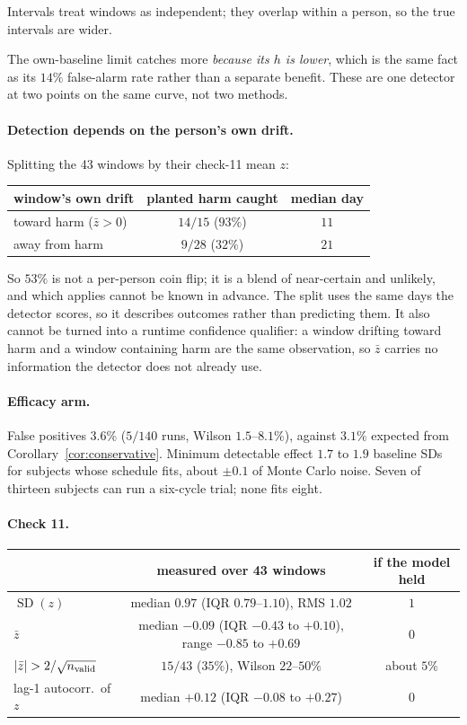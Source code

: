 \documentclass{article}
\theoremstyle{plain}
\theoremstyle{definition}
\theoremstyle{remark}
\numberwithin{equation}{section}
\begin{document}
\noindent Intervals treat windows as independent; they overlap within a
person, so the true intervals are wider.

The own-baseline limit catches more \emph{because its $h$ is lower}, which is
the same fact as its $14\%$ false-alarm rate rather than a separate benefit.
These are one detector at two points on the same curve, not two methods.

\paragraph{Detection depends on the person's own drift.} Splitting the 43
windows by their check-11 mean $z$:
\begin{center}
\begin{tabular}{lcc}
window's own drift & planted harm caught & median day \\
\hline
toward harm ($\bar z > 0$) & $14/15$ ($93\%$) & $11$ \\
away from harm & $9/28$ ($32\%$) & $21$ \\
\end{tabular}
\end{center}
So $53\%$ is not a per-person coin flip; it is a blend of near-certain and
unlikely, and which applies cannot be known in advance. The split uses the same
days the detector scores, so it describes outcomes rather than predicting them.
It also cannot be turned into a runtime confidence qualifier: a window drifting
toward harm and a window containing harm are the same observation, so $\bar z$
carries no information the detector does not already use.

\paragraph{Efficacy arm.} False positives $3.6\%$ ($5/140$ runs, Wilson
$1.5$--$8.1\%$), against $3.1\%$ expected from
Corollary~\ref{cor:conservative}. Minimum detectable effect $1.7$ to
$1.9$ baseline SDs for subjects whose schedule fits, about $\pm 0.1$ of Monte
Carlo noise. Seven of thirteen subjects can run a six-cycle trial; none fits
eight.

\paragraph{Check 11.}
\begin{center}
\begin{tabular}{lcc}
 & measured over 43 windows & if the model held \\
\hline
$\operatorname{SD}(z)$ & median $0.97$ (IQR $0.79$--$1.10$), RMS $1.02$ & $1$ \\
$\bar z$ & median $-0.09$ (IQR $-0.43$ to $+0.10$), range $-0.85$ to $+0.69$ & $0$ \\
$\abs{\bar z} > 2/\sqrt{n_{\mathrm{valid}}}$ & $15/43$ ($35\%$), Wilson $22$--$50\%$ & about $5\%$ \\
lag-1 autocorr.\ of $z$ & median $+0.12$ (IQR $-0.08$ to $+0.27$) & $0$ \\
\end{tabular}
\end{center}
\end{document}
